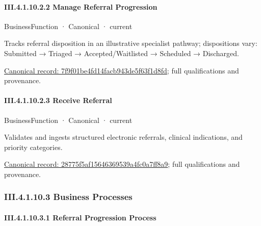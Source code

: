 \paragraph*{III.4.1.10.2.2 Manage Referral Progression}
\label{navigation:III.4.1.10.2.2}

\label{element:7f9f01be4fd14facb943de5f63f1d8fd}
{\small BusinessFunction · Canonical · current}\par

Tracks referral disposition in an illustrative specialist pathway; dispositions vary: Submitted → Triaged → Accepted/Waitlisted → Scheduled → Discharged.


{\footnotesize \href{../../../../continuum/business/business-function/7f9f01be4fd14facb943de5f63f1d8fd.md}{Canonical record: 7f9f01be4fd14facb943de5f63f1d8fd}; full qualifications and provenance.}\par
\paragraph*{III.4.1.10.2.3 Receive Referral}
\label{navigation:III.4.1.10.2.3}

\label{element:28775f5af15646369539a4fc0a7ff8a9}
{\small BusinessFunction · Canonical · current}\par

Validates and ingests structured electronic referrals, clinical indications, and priority categories.


{\footnotesize \href{../../../../continuum/business/business-function/28775f5af15646369539a4fc0a7ff8a9.md}{Canonical record: 28775f5af15646369539a4fc0a7ff8a9}; full qualifications and provenance.}\par
\subsubsection*{III.4.1.10.3 Business Processes}
\label{navigation:III.4.1.10.3}

\paragraph*{III.4.1.10.3.1 Referral Progression Process}
\label{navigation:III.4.1.10.3.1}

